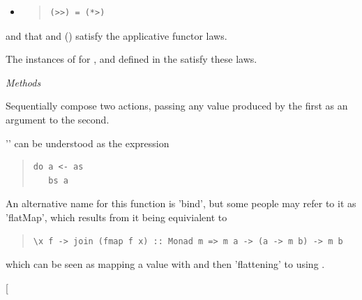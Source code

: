 \begin{haddockdesc}
{{\begin{itemize}
\begin{quote}
{\haddockverb\begin{verbatim}
fmap f xs  =  xs >>= return . f\end{verbatim}}
\end{quote}
\item
\begin{quote}
{\haddockverb\begin{verbatim}
(>>) = (*>)\end{verbatim}}
\end{quote}
\end{itemize}}
and that  and (\haddockid{<*>}) satisfy the applicative functor laws.\par
The instances of  for ,  and 
defined in the  satisfy these laws.\par
\haddockpremethods{}\emph{Methods}
\begin{haddockdesc}
\item[\begin{tabular}{@{}l}
(>>=) :: m a -> (a -> m b) -> m b
\end{tabular}]
{\haddockbegindoc
Sequentially compose two actions, passing any value produced
 by the first as an argument to the second.\par
'' can be understood as the  expression\par
\begin{quote}
{\haddockverb\begin{verbatim}
do a <- as
   bs a
\end{verbatim}}
\end{quote}
An alternative name for this function is 'bind', but some people
 may refer to it as 'flatMap', which results from it being equivialent
 to\par
\begin{quote}
{\haddockverb\begin{verbatim}
\x f -> join (fmap f x) :: Monad m => m a -> (a -> m b) -> m b\end{verbatim}}
\end{quote}
which can be seen as mapping a value with
  and then 'flattening'  to  using .\par}
\end{haddockdesc}
\begin{haddockdesc}
\item[\begin{tabular}{@{}l}

\end{tabular}
\end{haddockdesc}}
\end{haddockdesc}

